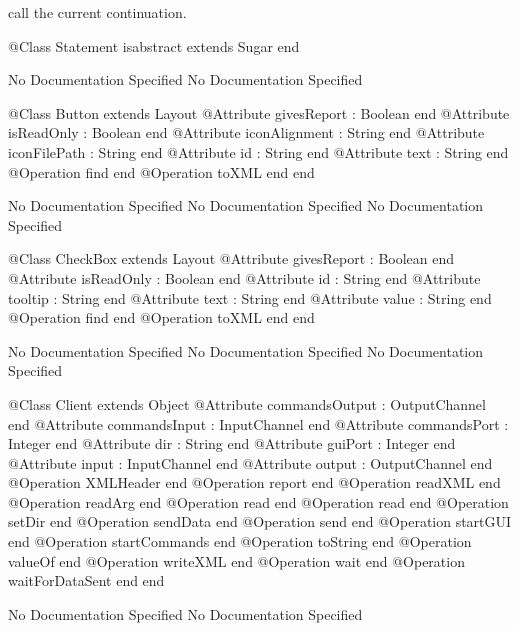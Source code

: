       call the current continuation.
\begin{Interface}
@Class Statement isabstract extends Sugar
end
\end{Interface}
No Documentation Specified
No Documentation Specified
\begin{Interface}
@Class Button extends Layout
  @Attribute givesReport : Boolean end
  @Attribute isReadOnly : Boolean end
  @Attribute iconAlignment : String end
  @Attribute iconFilePath : String end
  @Attribute id : String end
  @Attribute text : String end
  @Operation find end
  @Operation toXML end
end
\end{Interface}
No Documentation Specified
No Documentation Specified
No Documentation Specified
\begin{Interface}
@Class CheckBox extends Layout
  @Attribute givesReport : Boolean end
  @Attribute isReadOnly : Boolean end
  @Attribute id : String end
  @Attribute tooltip : String end
  @Attribute text : String end
  @Attribute value : String end
  @Operation find end
  @Operation toXML end
end
\end{Interface}
No Documentation Specified
No Documentation Specified
No Documentation Specified
\begin{Interface}
@Class Client extends Object
  @Attribute commandsOutput : OutputChannel end
  @Attribute commandsInput : InputChannel end
  @Attribute commandsPort : Integer end
  @Attribute dir : String end
  @Attribute guiPort : Integer end
  @Attribute input : InputChannel end
  @Attribute output : OutputChannel end
  @Operation XMLHeader end
  @Operation report end
  @Operation readXML end
  @Operation readArg end
  @Operation read end
  @Operation read end
  @Operation setDir end
  @Operation sendData end
  @Operation send end
  @Operation startGUI end
  @Operation startCommands end
  @Operation toString end
  @Operation valueOf end
  @Operation writeXML end
  @Operation wait end
  @Operation waitForDataSent end
end
\end{Interface}
No Documentation Specified
No Documentation Specified
